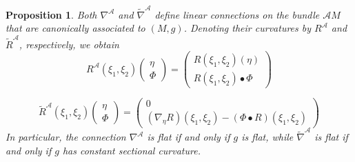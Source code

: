 \documentclass[12pt,a4paper]{amsart}
\def\Cal{\mathcal}
\newcommand{\tn}{\widetilde{\nabla}}
\newcounter{theorem}
\numberwithin{theorem}{section}
\numberwithin{equation}{section}
\newtheorem{prop}[theorem]{Proposition}
\theoremstyle{definition}
\theoremstyle{remark}
\begin{document}
\begin{prop}\label{prop2.2}
Both $\nabla^{\Cal A}$ and $\tn^{\Cal A}$ define linear connections on the bundle
$\Cal AM$ that are canonically associated to $(M,g)$. Denoting their curvatures by
$R^{\Cal A}$ and $\widetilde{R}^{\Cal A}$, respectively, we obtain
$$
R^{\Cal A}(\xi_1,\xi_2)\begin{pmatrix} \eta\\ \Phi \end{pmatrix}=\begin{pmatrix}
R(\xi_1,\xi_2)(\eta) \\ R(\xi_1,\xi_2)\bullet \Phi \end{pmatrix}
$$

$$ \widetilde{R}^{\Cal A}(\xi_1,\xi_2)\begin{pmatrix}
  \eta\\ \Phi \end{pmatrix}=\begin{pmatrix} 0 \\ (\nabla_\eta
R)(\xi_1,\xi_2)-(\Phi\bullet R)(\xi_1,\xi_2)\end{pmatrix}
$$
In particular, the connection $\nabla^{\Cal A}$ is flat if and only if $g$ is flat,
while $\tn^{\Cal A}$ is flat if and only if $g$ has constant sectional curvature.
\end{prop}
\end{document}

